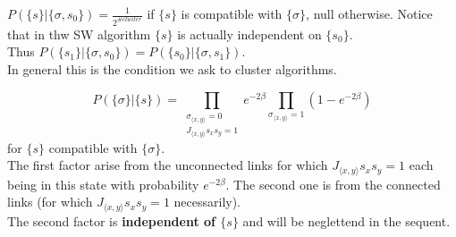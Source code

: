 \documentclass[12pt,handout]{beamer}
\begin{document}
\begin{frame}
\begin{center}
\vspace{20pt}
$P \left( \lbrace s \rbrace | \lbrace \sigma, s_0 \rbrace \right) =
 \frac{1}{2^{\# cluster}}$ if $\lbrace s \rbrace$ is compatible with $\lbrace \sigma \rbrace$, null otherwise. Notice that in thw SW algorithm $\lbrace s \rbrace$ is actually independent on $\lbrace s_0 \rbrace$.\\
\vspace{20pt} 
Thus {\large $P \left( \lbrace s_1 \rbrace | \lbrace \sigma, s_0 \rbrace \right) = P \left( \lbrace s_0 \rbrace | \lbrace \sigma, s_1 \rbrace \right)$}.\\
\vspace{20pt}
In general this is the condition we ask to cluster algorithms.




\end{center}
\end{frame}

\begin{frame}
\begin{center}

{\large
\[P \left( \lbrace \sigma \rbrace | \lbrace s \rbrace \right) =
\prod_{ \substack{ \sigma_{\langle x, y \rangle} = 0 \\ J_{\langle x, y \rangle} s_x s_y = 1}} e^{-2 \beta} \prod_{\sigma_{\langle x, y \rangle} = 1} \left( 1- e^{-2 \beta } \right)
\]} for $\lbrace s \rbrace$ compatible with $\lbrace \sigma \rbrace$.\\
\vspace{20pt}
The first factor arise from the unconnected links for which $J_{\langle x, y \rangle} s_x s_y = 1$ each being in this state with probability $e^{ - 2 \beta }$. The second one is from the connected links (for which $J_{\langle x, y \rangle} s_x s_y = 1$ necessarily).\\
\vspace{20pt}
The second factor is \textbf{independent of $\lbrace s \rbrace$} and will be neglettend in the sequent.

\end{center}
\end{frame}
\end{document}
